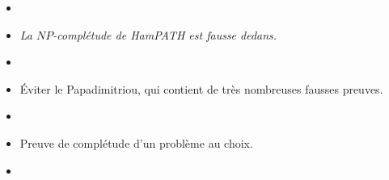 \documentclass{agregfiche}
\begin{document}
\secreferences

\begin{itemize}
    \item 
\item 
\textit{La $NP$-complétude de HamPATH est fausse dedans.}
\item 
\item Éviter le Papadimitriou, qui contient de très nombreuses fausses preuves.
\end{itemize}

\secdev

\begin{itemize}
    \item 
    \item Preuve de complétude d'un problème au choix.
    \item 
\end{itemize}
\end{document}
